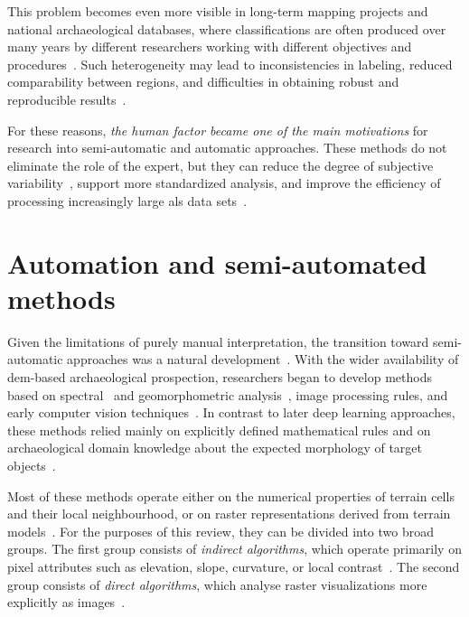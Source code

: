 This problem becomes even more visible in long-term mapping projects and national archaeological databases, where classifications are often produced over many years by different researchers working with different objectives and procedures~\cite{cowley_what_2016}. Such heterogeneity may lead to inconsistencies in labeling, reduced comparability between regions, and difficulties in obtaining robust and reproducible results~\cite{cowley_what_2016,kokalj_standardizing_2025}.

For these reasons, \emph{the human factor became one of the main motivations} for research into semi-automatic and automatic approaches. These methods do not eliminate the role of the expert, but they can reduce the degree of subjective variability~\cite{somrak_learning_2020}, support more standardized analysis, and improve the efficiency of processing increasingly large \gls{als} data sets~\cite{bundzel_semantic_2020,verschoof-van_der_vaart_combining_2020}.

\section{Automation and semi-automated methods}
Given the limitations of purely manual interpretation, the transition toward semi-automatic approaches was a natural development~\cite{trier_using_2019,blaschke_object_2010}. With the wider availability of \gls{dem}-based archaeological prospection, researchers began to develop methods based on spectral~\cite{gonzales2002digital} and geomorphometric analysis~\cite{wilson_terrain_2000}, image processing rules, and early computer vision techniques~\cite{longuet1982theory}. In contrast to later deep learning approaches, these methods relied mainly on explicitly defined mathematical rules and on archaeological domain knowledge about the expected morphology of target objects~\cite{verschoof-van_der_vaart_combining_2020,blaschke_object_2010}.

Most of these methods operate either on the numerical properties of terrain cells and their local neighbourhood, or on raster representations derived from terrain models~\cite{kokalj_standardizing_2025,blaschke_object_2010}. For the purposes of this review, they can be divided into two broad groups. The first group consists of \textit{indirect algorithms}, which operate primarily on pixel attributes such as elevation, \gls{slope}, curvature, or local contrast~\cite{MILIARESIS20071076}. The second group consists of \textit{direct algorithms}, which analyse raster visualizations more explicitly as images~\cite{blaschke_object_2010,guyot_objective_2021}.

